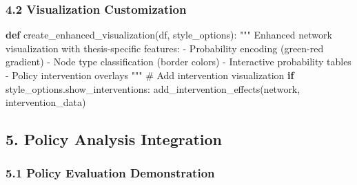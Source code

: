 \documentclass[
  11pt,
  letterpaper,
]{book}
\newenvironment{Shaded}{\begin{snugshade}}{\end{snugshade}}
\newcommand{\CommentTok}[1]{\textcolor[rgb]{0.37,0.37,0.37}{#1}}
\newcommand{\ControlFlowTok}[1]{\textcolor[rgb]{0.00,0.23,0.31}{\textbf{#1}}}
\newcommand{\KeywordTok}[1]{\textcolor[rgb]{0.00,0.23,0.31}{\textbf{#1}}}
\newcommand{\NormalTok}[1]{\textcolor[rgb]{0.00,0.23,0.31}{#1}}
\begin{document}
\subsubsection{4.2 Visualization
Customization}\label{visualization-customization}

\begin{Shaded}
\begin{Highlighting}[]
\KeywordTok{def}\NormalTok{ create\_enhanced\_visualization(df, style\_options):}
    \CommentTok{"""}
\CommentTok{    Enhanced network visualization with thesis{-}specific features:}
\CommentTok{    {-} Probability encoding (green{-}red gradient)}
\CommentTok{    {-} Node type classification (border colors)}
\CommentTok{    {-} Interactive probability tables}
\CommentTok{    {-} Policy intervention overlays}
\CommentTok{    """}
    \CommentTok{\# Add intervention visualization}
    \ControlFlowTok{if}\NormalTok{ style\_options.show\_interventions:}
\NormalTok{        add\_intervention\_effects(network, intervention\_data)}
\end{Highlighting}
\end{Shaded}

\subsection{5. Policy Analysis
Integration}\label{policy-analysis-integration}

\subsubsection{5.1 Policy Evaluation
Demonstration}\label{policy-evaluation-demonstration}
\end{document}
